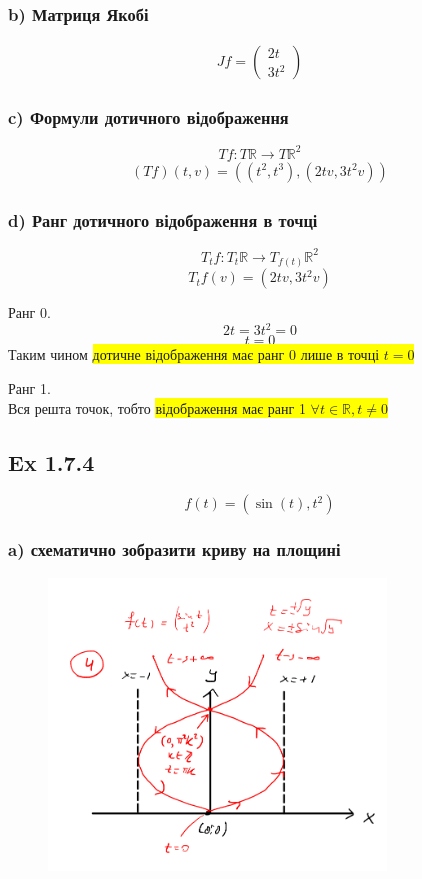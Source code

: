 \documentclass[10pt, a4paper]{article} %
\newcommand{\R}{\mathbb{R}}
\begin{document}
\subsubsection*{b) Матриця Якобі}
\begin{align*}
    Jf = \begin{pmatrix}
        2t \\ 3t^2
    \end{pmatrix}
\end{align*}

\subsubsection*{c) Формули дотичного відображення}
\[Tf : T\R \to T\R^2\]
\begin{align*}
    (Tf)(t, v) = \left((t^2, t^3), (2tv, 3t^2v)\right)
\end{align*}

\subsubsection*{d) Ранг дотичного відображення в точці}
\[T_{t}f: T_{t}\R \to T_{f(t)}\R^2\]
\[T_{t}f(v) = (2tv, 3t^2v)\]

Ранг 0.
\[2t = 3t^2 = 0\]
\[t = 0\]
Таким чином \colorbox{yellow}{дотичне відображення має ранг 0 лише в точці $t=0$}

Ранг 1.\\
Вся решта точок, тобто \colorbox{yellow}{відображення має ранг 1 $\forall t \in \R, t\ne 0$}



\subsection*{Ex 1.7.4}
\[f(t) = (\sin(t), t^2)\]

\subsubsection*{a) схематично зобразити криву на площині}
\begin{figure}[h]
    \includegraphics[width=0.8\textwidth]{1.7.4.png}
    \centering
\end{figure}
\end{document}
